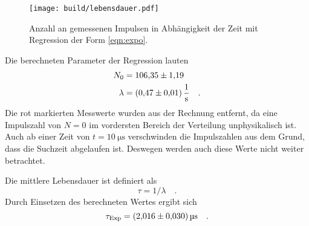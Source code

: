 \begin{figure}[H]
  \centering
  \texttt{[image: build/lebensdauer.pdf]}
  \caption{Anzahl an gemessenen Impulsen in Abhängigkeit der Zeit mit Regression der Form \ref{eqn:expo}.}
  \label{fig:lebensdauer}
\end{figure}

Die berechneten Parameter der Regression lauten
\begin{align*}
  N_0    &=\num{106.35 \pm 1.19} \\
  \lambda&=\SI{0.47 \pm 0.01}{\per\second}\quad .
\end{align*}
Die rot markierten Messwerte wurden aus der Rechnung entfernt, da eine Impulszahl von $N=0$ im vordersten Bereich der Verteilung unphysikalisch ist. Auch ab einer 
Zeit von $t=\SI{10}{\micro\second}$ verschwinden die Impulszahlen aus dem Grund, dass die Suchzeit abgelaufen ist. Deswegen werden auch diese Werte nicht weiter
betrachtet.

Die mittlere Lebensdauer ist definiert als
\begin{equation*}
  \tau=1/\lambda\quad .
\end{equation*}
Durch Einsetzen des berechneten Wertes ergibt sich 
\begin{equation*}
  \tau_\text{Exp}=\SI{2.016\pm0.030}{\micro\second}\quad .
\end{equation*}
